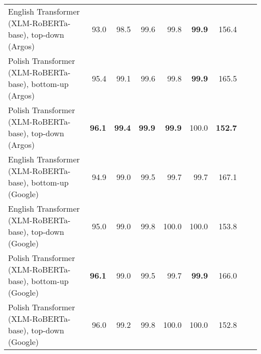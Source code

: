 \begin{table}[ht!]
{\begin{tabular}{lrrrrrrrr}
  English Transformer (XLM-RoBERTa-base), top-down (Argos) & 93.0 & 98.5 & 99.6 & 99.8 & \textbf{99.9} & 156.4 \\ 
  Polish Transformer (XLM-RoBERTa-base), bottom-up (Argos) & 95.4 & 99.1 & 99.6 & 99.8 & \textbf{99.9} & 165.5 \\ 
  Polish Transformer (XLM-RoBERTa-base), top-down (Argos) & \textbf{96.1} & \textbf{99.4} & \textbf{99.9} & \textbf{99.9} & 100.0 & \textbf{152.7} \\ 
  English Transformer (XLM-RoBERTa-base), bottom-up (Google) & 94.9 & 99.0 & 99.5 & 99.7 & 99.7 & 167.1 \\ 
  English Transformer (XLM-RoBERTa-base), top-down (Google) & 95.0 & 99.0 & 99.8 & 100.0 & 100.0 & 153.8 \\ 
  Polish Transformer (XLM-RoBERTa-base), bottom-up (Google) & \textbf{96.1} & 99.0 & 99.5 & 99.7 & \textbf{99.9} & 166.0 \\ 
  Polish Transformer (XLM-RoBERTa-base), top-down (Google) & 96.0 & 99.2 & 99.8 & 100.0 & 100.0 & 152.8 \\ 
   \hline
\end{tabular}
}
\end{table}




